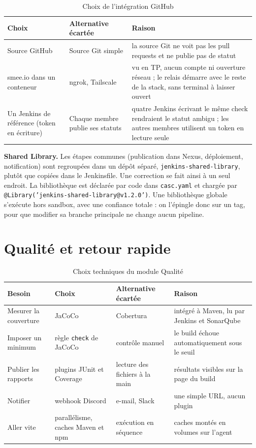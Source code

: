 \documentclass[11pt,a4paper]{report}
\begin{document}
\begin{table}[H]
  \centering
  \small
  \begin{tabularx}{\textwidth}{@{}L{3cm}L{3cm}Y@{}}
    \toprule
    \textbf{Choix} & \textbf{Alternative écartée} & \textbf{Raison} \\
    \midrule
    Source GitHub & Source Git simple & la source Git ne voit pas les pull requests et ne publie pas de statut \\
    \addlinespace
    smee.io dans un conteneur & ngrok, Tailscale & vu en TP, aucun compte ni ouverture réseau ; le relais démarre avec le reste de la stack, sans terminal à laisser ouvert \\
    \addlinespace
    Un Jenkins de référence (token en écriture) & Chaque membre publie ses statuts & quatre Jenkins écrivant le même check rendraient le statut ambigu ; les autres membres utilisent un token en lecture seule \\
    \bottomrule
  \end{tabularx}
  \caption{Choix de l'intégration GitHub}
\end{table}

\textbf{Shared Library.} Les étapes communes (publication dans Nexus, déploiement, notification) sont regroupées dans un dépôt séparé, \texttt{jenkins-shared-library}, plutôt que copiées dans le Jenkinsfile. Une correction se fait ainsi à un seul endroit. La bibliothèque est déclarée par code dans \texttt{casc.yaml} et chargée par \texttt{@Library('jenkins-shared-library@v1.2.0')}. Une bibliothèque globale s'exécute hors sandbox, avec une confiance totale : on l'épingle donc sur un tag, pour que modifier sa branche principale ne change aucun pipeline.

\section{Qualité et retour rapide}
\begin{table}[H]
  \centering
  \small
  \begin{tabularx}{\textwidth}{@{}L{2.6cm}L{3cm}L{2.8cm}Y@{}}
    \toprule
    \textbf{Besoin} & \textbf{Choix} & \textbf{Alternative écartée} & \textbf{Raison} \\
    \midrule
    Mesurer la couverture & JaCoCo & Cobertura & intégré à Maven, lu par Jenkins et SonarQube \\
    \addlinespace
    Imposer un minimum & règle \texttt{check} de JaCoCo & contrôle manuel & le build échoue automatiquement sous le seuil \\
    \addlinespace
    Publier les rapports & plugins JUnit et Coverage & lecture des fichiers à la main & résultats visibles sur la page du build \\
    \addlinespace
    Notifier & webhook Discord & e-mail, Slack & une simple URL, aucun plugin \\
    \addlinespace
    Aller vite & parallélisme, caches Maven et npm & exécution en séquence & caches montés en volumes sur l'agent \\
    \bottomrule
  \end{tabularx}
  \caption{Choix techniques du module Qualité}
\end{table}
\end{document}
